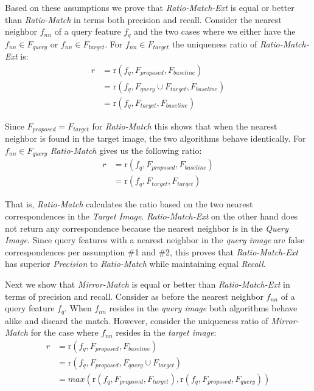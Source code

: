 \documentclass[journal]{IEEEtran}
\begin{document}
Based on these assumptions we prove that \emph{Ratio-Match-Ext} is equal 
or better than \emph{Ratio-Match} in terms both precision and recall.  
Consider the nearest neighbor $f_{nn}$ of a query feature $f_{q}$ and 
the two cases where we either have the $f_{nn} \in F_{query}$ or $f_{nn} 
\in F_{target}$. For $f_{nn} \in F_{target}$ the uniqueness ratio of 
\emph{Ratio-Match-Ext} is:
\begin{align*}
    r &= \text{r}(f_{q}, F_{proposed}, F_{baseline}) \\
        &= \text{r}(f_{q}, F_{query} \cup F_{target}, F_{baseline})\\
        &= \text{r}(f_{q}, F_{target}, F_{baseline})
\end{align*}

Since $F_{proposed} = F_{target}$ for \emph{Ratio-Match} this shows that
when the nearest neighbor is found in the target image, the two 
algorithms behave identically. For $f_{nn} \in F_{query}$ 
\emph{Ratio-Match} gives us the following ratio:
\begin{align*}
    r &= \text{r}(f_{q}, F_{proposed}, F_{baseline}) \\
        &= \text{r}(f_{q}, F_{target}, F_{target})
\end{align*}


That is, \emph{Ratio-Match} calculates the ratio based on the two 
nearest correspondences in the \emph{Target Image}. 
\emph{Ratio-Match-Ext} on the other hand does not return any 
correspondence because the nearest neighbor is in the \emph{Query 
Image}. Since query features with a nearest neighbor in the \emph{query 
image} are false correspondences per assumption \#1 and \#2, this proves 
that \emph{Ratio-Match-Ext} has superior \emph{Precision} to 
\emph{Ratio-Match} while maintaining equal \emph{Recall}.

Next we show that \emph{Mirror-Match} is equal or better than 
\emph{Ratio-Match-Ext} in terms of precision and recall. Consider as 
before the nearest neighbor $f_{nn}$ of a query feature $f_{q}$. When 
$f_{nn}$ resides in the \emph{query image} both algorithms behave alike 
and discard the match.  However, consider the uniqueness ratio of 
\emph{Mirror-Match} for the case where $f_{nn}$ resides in the 
\emph{target image}:
\begin{align*}
    r &= \text{r}(f_{q}, F_{proposed}, F_{baseline}) \\
        &= \text{r}(f_{q}, F_{proposed}, F_{query} \cup F_{target})\\
        &= max( \text{r}(f_{q}, F_{proposed}, F_{target}), 
    \text{r}(f_{q}, F_{proposed}, F_{query}) )
\end{align*}
\end{document}
